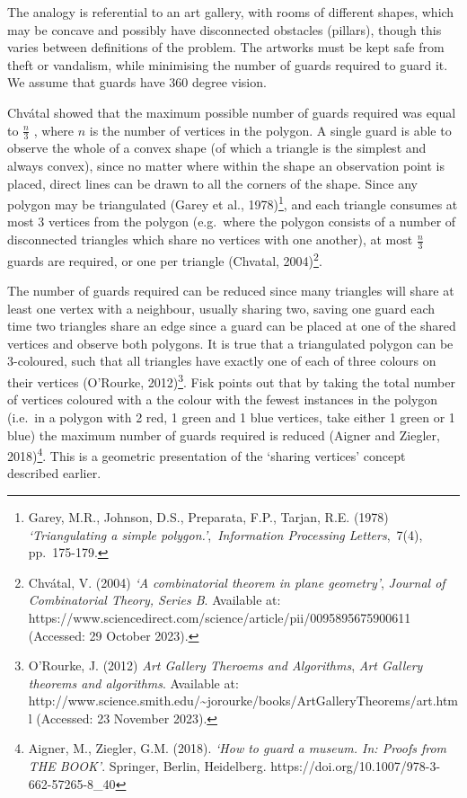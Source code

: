 \documentclass[
]{article}
\begin{document}
The analogy is referential to an art gallery, with rooms of different
shapes, which may be concave and possibly have disconnected obstacles
(pillars), though this varies between definitions of the problem. The
artworks must be kept safe from theft or vandalism, while minimising the
number of guards required to guard it. We assume that guards have 360
degree vision.

Chvátal showed that the maximum possible number of guards required was
equal to \(\frac{n}{3}\) , where \(n\) is the number of vertices in the
polygon. A single guard is able to observe the whole of a convex shape
(of which a triangle is the simplest and always convex), since no matter
where within the shape an observation point is placed, direct lines can
be drawn to all the corners of the shape. Since any polygon may be
triangulated (Garey et al., 1978)\footnote{Garey, M.R., Johnson, D.S.,
  Preparata, F.P., Tarjan, R.E. (1978) \emph{`Triangulating a simple
  polygon.'},~\emph{Information Processing Letters},~7(4), pp.~175-179.},
and each triangle consumes at most 3 vertices from the polygon
(e.g.~where the polygon consists of a number of disconnected triangles
which share no vertices with one another), at most \(\frac{n}{3}\)
guards are required, or one per triangle (Chvatal, 2004)\footnote{Chvátal,
  V. (2004) \emph{`A combinatorial theorem in plane geometry'},
  \emph{Journal of Combinatorial Theory, Series B}. Available at:
  https://www.sciencedirect.com/science/article/pii/0095895675900611
  (Accessed: 29 October 2023).}.

The number of guards required can be reduced since many triangles will
share at least one vertex with a neighbour, usually sharing two, saving
one guard each time two triangles share an edge since a guard can be
placed at one of the shared vertices and observe both polygons. It is
true that a triangulated polygon can be 3-coloured, such that all
triangles have exactly one of each of three colours on their vertices
(O'Rourke, 2012)\footnote{O'Rourke, J. (2012) \emph{Art Gallery Theroems
  and Algorithms}, \emph{Art Gallery theorems and algorithms}. Available
  at:
  http://www.science.smith.edu/\textasciitilde jorourke/books/ArtGalleryTheorems/art.html
  (Accessed: 23 November 2023).}. Fisk points out that by taking the
total number of vertices coloured with a the colour with the fewest
instances in the polygon (i.e.~in a polygon with 2 red, 1 green and 1
blue vertices, take either 1 green or 1 blue) the maximum number of
guards required is reduced (Aigner and Ziegler, 2018)\footnote{Aigner,
  M., Ziegler, G.M. (2018). \emph{`How to guard a museum. In: Proofs
  from THE BOOK'}. Springer, Berlin, Heidelberg.
  https://doi.org/10.1007/978-3-662-57265-8\_40}. This is a geometric
presentation of the `sharing vertices' concept described earlier.
\end{document}
